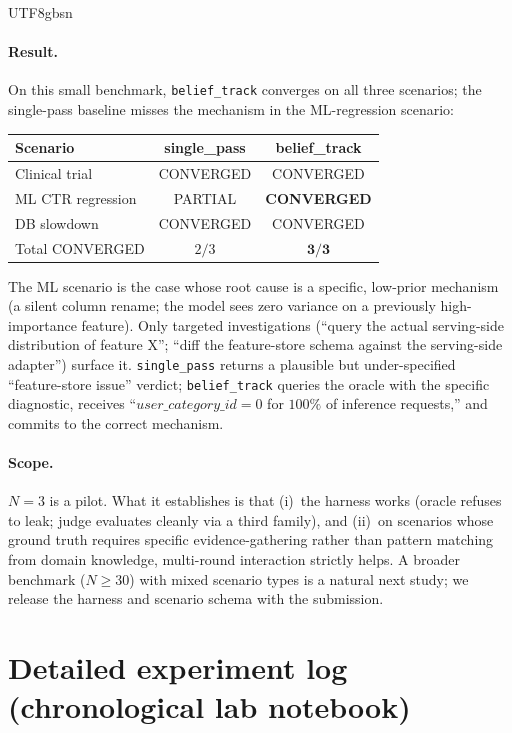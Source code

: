 \documentclass{article}
\begin{document}
\begin{CJK*}{UTF8}{gbsn}
\paragraph{Result.} On this small benchmark,
\texttt{belief\_track} converges on all three scenarios; the
single-pass baseline misses the mechanism in the ML-regression
scenario:

\begin{center}\small
\begin{tabular}{l c c}
  \toprule
  Scenario & single\_pass & belief\_track \\
  \midrule
  Clinical trial    & CONVERGED & CONVERGED \\
  ML CTR regression & PARTIAL   & \textbf{CONVERGED} \\
  DB slowdown       & CONVERGED & CONVERGED \\
  \midrule
  Total CONVERGED   & \(2/3\)   & \(\mathbf{3/3}\) \\
  \bottomrule
\end{tabular}
\end{center}

\noindent The ML scenario is the case whose root cause is a
specific, low-prior mechanism (a silent column rename; the model
sees zero variance on a previously high-importance feature). Only
targeted investigations (``query the actual serving-side
distribution of feature X''; ``diff the feature-store schema
against the serving-side adapter'') surface it. \texttt{single\_pass}
returns a plausible but under-specified ``feature-store issue''
verdict; \texttt{belief\_track} queries the oracle with the
specific diagnostic, receives ``\(user\_category\_id = 0\) for
\(100\%\) of inference requests,'' and commits to the correct
mechanism.

\paragraph{Scope.} \(N = 3\) is a pilot. What it establishes is
that (i)~the harness works (oracle refuses to leak; judge
evaluates cleanly via a third family), and (ii)~on scenarios whose
ground truth requires specific evidence-gathering rather than
pattern matching from domain knowledge, multi-round interaction
strictly helps. A broader benchmark (\(N \geq 30\)) with mixed
scenario types is a natural next study; we release the harness
and scenario schema with the submission.

\section{Detailed experiment log (chronological lab notebook)}
\label{app:exp-log}


\end{CJK*}
\end{document}
